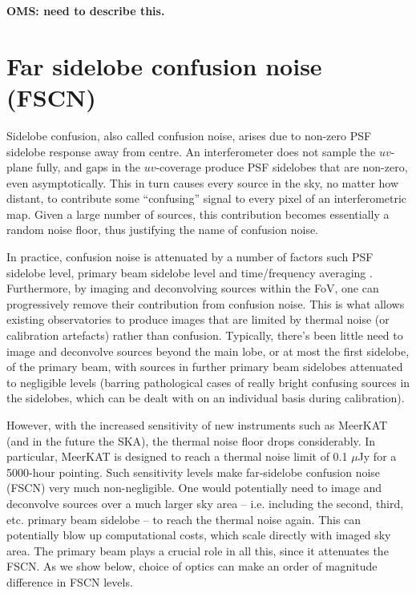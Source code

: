 \documentclass{aa}
\begin{document}
{\bf OMS: need to describe this.}


\section{Far sidelobe confusion noise (FSCN)}
\label{sec:fsn}

Sidelobe confusion, also called confusion noise, arises due to non-zero PSF sidelobe response away from centre. An interferometer does not sample the $uv$-plane fully, and gaps in the $uv$-coverage produce PSF sidelobes that are non-zero, even asymptotically. This in turn causes every source in the sky, no matter how distant, to contribute some ``confusing'' signal to every pixel of an interferometric map. Given a large number of sources, this contribution becomes essentially a random noise floor, thus justifying the name of confusion noise.

In practice, confusion noise is attenuated by a number of factors such PSF sidelobe level, primary beam sidelobe level and time/frequency averaging \citep[see Fig.~2 in][for an illustration]{SKA54-expa,SKA54}. Furthermore, by imaging and deconvolving sources within the FoV, one can progressively remove their contribution from confusion noise. This is what allows existing observatories to produce images that are limited by thermal noise (or calibration artefacts) rather than confusion. Typically, there's been little need to image and deconvolve sources beyond the main lobe, or at most the first sidelobe, of the primary beam, with sources in further primary beam sidelobes attenuated to negligible levels (barring pathological cases of really bright confusing sources in the sidelobes, which can be dealt with on an individual basis during calibration).

However, with the increased sensitivity of new instruments such as MeerKAT (and in the future the SKA), the thermal noise floor drops considerably. In particular, MeerKAT is designed to reach a thermal noise limit of 0.1 $\mu$Jy for a 5000-hour pointing. Such sensitivity levels make far-sidelobe confusion noise (FSCN) very much non-negligible. One would potentially need to image and deconvolve sources over a much larger sky area -- i.e. including the second, third, etc. primary beam sidelobe -- to reach the thermal noise again. This can potentially blow up computational costs, which scale directly with imaged sky area. The primary beam plays a crucial role in all this, since it attenuates the FSCN. As we show below, choice of optics can make an order of magnitude difference in FSCN levels.
\end{document}

